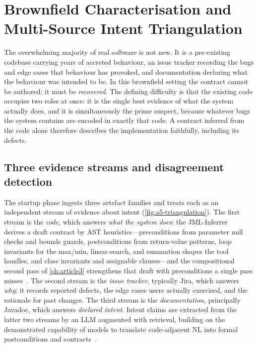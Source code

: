 \section{Brownfield Characterisation and Multi-Source Intent Triangulation}\label{sec:a5-brownfield}

The overwhelming majority of real software is not new. It is a pre-existing codebase carrying years of accreted behaviour, an issue tracker recording the bugs and edge cases that behaviour has provoked, and documentation declaring what the behaviour was intended to be. In this brownfield setting the contract cannot be authored; it must be \emph{recovered}. The defining difficulty is that the existing code occupies two roles at once: it is the single best evidence of what the system actually does, and it is simultaneously the prime suspect, because whatever bugs the system contains are encoded in exactly that code. A contract inferred from the code alone therefore describes the implementation faithfully, including its defects.

\subsection{Three evidence streams and disagreement detection}\label{subsec:a5-streams}

The startup phase ingests three artefact families and treats each as an independent stream of evidence about intent (\cref{fig:a5-triangulation}). The first stream is the \emph{code}, which answers \emph{what the system does}: the JML-Inferrer~\cite{edmonds_article1,edmonds_article3} derives a draft contract by AST heuristics---preconditions from parameter null checks and bounds guards, postconditions from return-value patterns, loop invariants for the max/min, linear-search, and summation shapes the tool handles, and class invariants and assignable clauses---and the compositional second pass of \cref{ch:article3} strengthens that draft with preconditions a single pass misses~\cite{edmonds_article3}. The second stream is the \emph{issue tracker}, typically Jira, which answers \emph{why}: it records reported defects, the edge cases users actually exercised, and the rationale for past changes. The third stream is the \emph{documentation}, principally Javadoc, which answers \emph{declared intent}. Intent claims are extracted from the latter two streams by an LLM augmented with retrieval, building on the demonstrated capability of models to translate code-adjacent NL into formal postconditions and contracts~\cite{endres2024nl2postcond,ma2025specgen,lahiri2025nl2contract,cosler2023nl2spec}.

